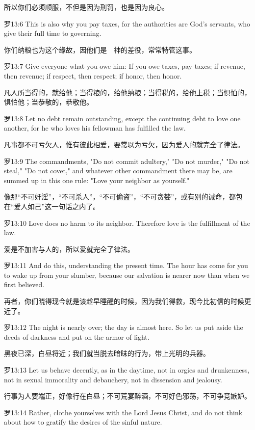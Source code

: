 \documentclass[a4paper,11pt,onecolumn,twoside]{ctexart}
\begin{document}
\begin{multicols}{2}
 所以你们必须顺服，不但是因为刑罚，也是因为良心。


 罗13:6
 This is also why you pay taxes, for the authorities are God's servants, who give their full time to governing.

 你们纳粮也为这个缘故，因他们是　神的差役，常常特管这事。


 罗13:7
 Give everyone what you owe him: If you owe taxes, pay taxes; if revenue, then revenue; if respect, then respect; if honor, then honor.

 凡人所当得的，就给他；当得粮的，给他纳粮；当得税的，给他上税；当惧怕的，惧怕他；当恭敬的，恭敬他。


 罗13:8
 Let no debt remain outstanding, except the continuing debt to love one another, for he who loves his fellowman has fulfilled the law.

 凡事都不可亏欠人，惟有彼此相爱，要常以为亏欠，因为爱人的就完全了律法。


 罗13:9
 The commandments, "Do not commit adultery," "Do not murder," "Do not steal," "Do not covet," and whatever other commandment there may be, are summed up in this one rule: "Love your neighbor as yourself."

 像那“不可奸淫”，“不可杀人”，“不可偷盗”，“不可贪婪”，或有别的诫命，都包在“爱人如己”这一句话之内了。


 罗13:10
 Love does no harm to its neighbor. Therefore love is the fulfillment of the law.

 爱是不加害与人的，所以爱就完全了律法。


 罗13:11
 And do this, understanding the present time. The hour has come for you to wake up from your slumber, because our salvation is nearer now than when we first believed.

 再者，你们晓得现今就是该趁早睡醒的时候，因为我们得救，现今比初信的时候更近了。


 罗13:12
 The night is nearly over; the day is almost here. So let us put aside the deeds of darkness and put on the armor of light.

 黑夜已深，白昼将近；我们就当脱去暗昧的行为，带上光明的兵器。


 罗13:13
 Let us behave decently, as in the daytime, not in orgies and drunkenness, not in sexual immorality and debauchery, not in dissension and jealousy.

 行事为人要端正，好像行在白昼；不可荒宴醉酒，不可好色邪荡，不可争竞嫉妒。


 罗13:14
 Rather, clothe yourselves with the Lord Jesus Christ, and do not think about how to gratify the desires of the sinful nature.


\end{multicols}
\end{document}
